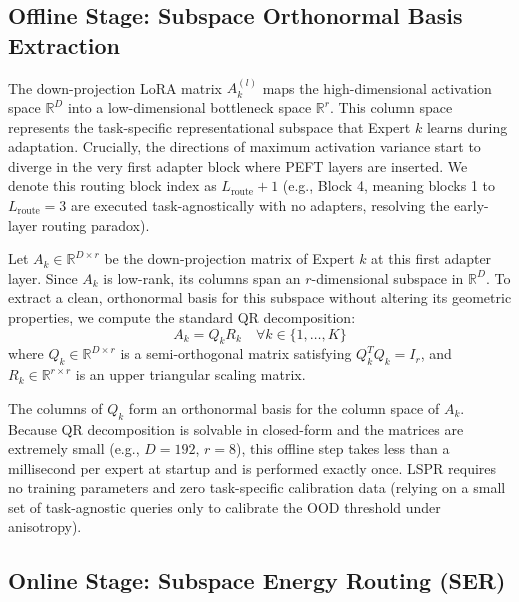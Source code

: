 \subsection{Offline Stage: Subspace Orthonormal Basis Extraction}
\label{subsec:method_offline}

The down-projection LoRA matrix $A_k^{(l)}$ maps the high-dimensional activation space $\mathbb{R}^D$ into a low-dimensional bottleneck space $\mathbb{R}^r$. This column space represents the task-specific representational subspace that Expert $k$ learns during adaptation. Crucially, the directions of maximum activation variance start to diverge in the very first adapter block where PEFT layers are inserted. We denote this routing block index as $L_{\text{route}}+1$ (e.g., Block 4, meaning blocks 1 to $L_{\text{route}}=3$ are executed task-agnostically with no adapters, resolving the early-layer routing paradox).

Let $A_k \in \mathbb{R}^{D \times r}$ be the down-projection matrix of Expert $k$ at this first adapter layer. Since $A_k$ is low-rank, its columns span an $r$-dimensional subspace in $\mathbb{R}^D$. To extract a clean, orthonormal basis for this subspace without altering its geometric properties, we compute the standard QR decomposition:
\begin{equation}
    A_k = Q_k R_k \quad \forall k \in \{1, \dots, K\}
\end{equation}
where $Q_k \in \mathbb{R}^{D \times r}$ is a semi-orthogonal matrix satisfying $Q_k^T Q_k = I_r$, and $R_k \in \mathbb{R}^{r \times r}$ is an upper triangular scaling matrix. 

The columns of $Q_k$ form an orthonormal basis for the column space of $A_k$. Because QR decomposition is solvable in closed-form and the matrices are extremely small (e.g., $D=192$, $r=8$), this offline step takes less than a millisecond per expert at startup and is performed exactly once. LSPR requires no training parameters and zero task-specific calibration data (relying on a small set of task-agnostic queries only to calibrate the OOD threshold under anisotropy).

\subsection{Online Stage: Subspace Energy Routing (SER)}
\label{subsec:method_online}

